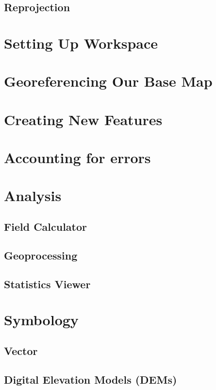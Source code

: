 \documentclass{article}
\begin{document}
\subsection{Reprojection}

\section{Setting Up Workspace}

\section{Georeferencing Our Base Map}

\section{Creating New Features}

\section{Accounting for errors}

\section{Analysis}

\subsection{Field Calculator}

\subsection{Geoprocessing}

\subsection{Statistics Viewer}

\section{Symbology}

\subsection{Vector}

\subsection{Digital Elevation Models (DEMs)}
\end{document}
